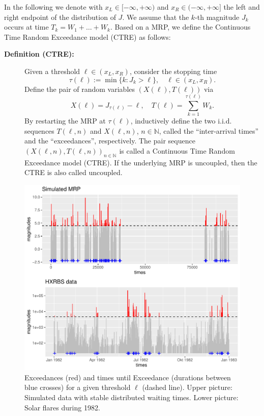\documentclass[]{elsarticle} %
\begin{document}
In the following we denote with \(x_L \in [-\infty, +\infty)\) and
\(x_R \in (-\infty, +\infty]\) the left and right endpoint of the
distribution of \(J\). We assume that the \(k\)-th magnitude \(J_k\)
occurs at time \(T_k = W_1 + \ldots + W_k\). Based on a MRP, we define
the Continuous Time Random Exceedance model (CTRE) as follows:

\begin{description}
\item[\textbf{Definition (CTRE):}]
Given a threshold \(\ell \in (x_L, x_R)\), consider the stopping time
\[\tau(\ell) := \min\{k: J_k > \ell\},\quad \ell \in (x_L, x_R).\]
Define the pair of random variables \((X(\ell), T(\ell))\) via
\[X(\ell) = J_{\tau(\ell)} - \ell, \quad 
T(\ell) = \sum_{k=1}^{\tau(\ell)} W_k.\] By restarting the MRP at
\(\tau(\ell)\), inductively define the two i.i.d. sequences
\(T(\ell,n)\) and \(X(\ell, n)\), \(n \in \mathbb N\), called the
``inter-arrival times'' and the ``exceedances'', respectively. The pair
sequence \((X(\ell, n), T(\ell, n))_{n \in \mathbb N}\) is called a
Continuous Time Random Exceedance model (CTRE). If the underlying MRP is
uncoupled, then the CTRE is also called uncoupled.
\end{description}

\begin{figure}

{\centering \includegraphics[width=0.7\linewidth]{article_springer_files/figure-latex/thresholdedBursty-1} 

}

\caption{\label{fig:thresholdedBursty} Exceedances (red) and times until Exceedance (durations between blue crosses) for a given threshold $\ell$ (dashed line). Upper picture: Simulated data with stable distributed waiting times. Lower picture: Solar flares during 1982.}\label{fig:thresholdedBursty}
\end{figure}
\end{document}
